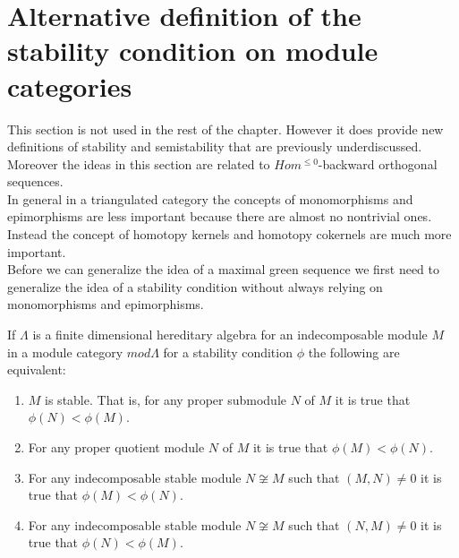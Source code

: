 \section{Alternative definition of the stability condition on module categories}
\indent This section is not used in the rest of the chapter. However it does provide new definitions of stability and semistability that are previously underdiscussed. Moreover the ideas in this section are related to $Hom^{\leq 0}$-backward orthogonal sequences.\\
\indent In general in a triangulated category the concepts of monomorphisms and epimorphisms are less important because there are almost no nontrivial ones. Instead the concept of homotopy kernels and homotopy cokernels are much more important.\\
\indent Before we can generalize the idea of a maximal green sequence we first need to generalize the idea of a stability condition without always relying on monomorphisms and epimorphisms.\\
\begin{theorem}
If $\Lambda$ is a finite dimensional hereditary algebra for an indecomposable module $M$ in a module category $mod \Lambda$ for a stability condition $\phi$ the following are equivalent:
\begin{enumerate}
\item $M$ is stable. That is, for any proper submodule $N$ of $M$ it is true that $\phi(N)<\phi(M)$.
\item For any proper quotient module $N$ of $M$ it is true that $\phi(M)<\phi(N)$.
\item For any indecomposable stable module $N\not\cong M$ such that $(M,N)\neq 0$ it is true that $\phi(M)<\phi(N)$.
\item For any indecomposable stable module $N\not\cong M$ such that $(N,M)\neq 0$ it is true that $\phi(N)<\phi(M)$.
\end{enumerate}
\end{theorem}
